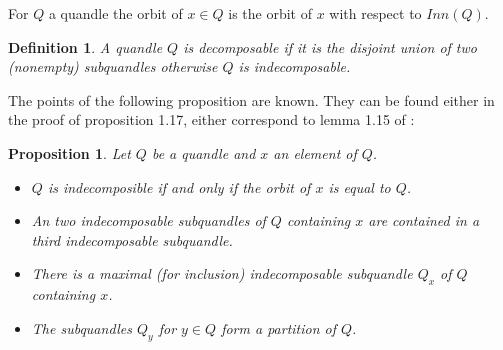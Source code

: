 \documentclass[12pt, reqno]{amsart}
\newtheorem{proposition}[theorem]{Proposition}
\newtheorem{definition}[theorem]{Definition}
\begin{document}
For $Q$ a quandle the orbit of $x\in Q$ is the orbit of $x$ with respect to $Inn(Q)$.
\begin{definition}
A quandle $Q$ is decomposable if it is the disjoint union of two (nonempty) subquandles otherwise $Q$ is indecomposable.
\end{definition}
The points of the following proposition are known. They can be found either in the proof of proposition 1.17, either correspond to lemma 1.15  of \cite{deco} :
\begin{proposition}\label{ind}
Let $Q$ be a quandle and $x$ an element of $Q$.
\begin{itemize}
\item[1)] $Q$ is indecomposible if and only if the orbit of $x$ is equal to $Q$.
\item[2)] An two indecomposable subquandles of $Q$ containing $x$ are contained in a third indecomposable subquandle.
\item[3)] There is a maximal (for inclusion) indecomposable subquandle $Q_x$ of $Q$ containing $x$.
\item[4)] The subquandles $Q_y$ for $y\in Q$ form a partition of $Q$.
\end{itemize}
\end{proposition}
\end{document}
